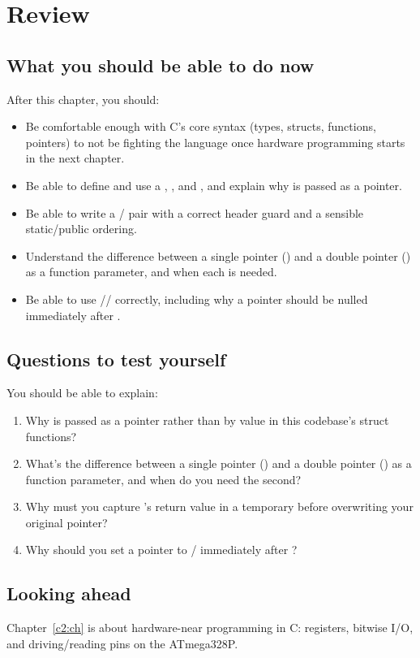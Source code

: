 
\section{Review}
\label{c1:sec:review}

\subsection*{What you should be able to do now}
After this chapter, you should:
\begin{itemize}
  \item Be comfortable enough with C's core syntax (types, structs, functions, pointers) to not be
    fighting the language once hardware programming starts in the next chapter.
  \item Be able to define and use a , , and , and explain why
     is passed as a pointer.
  \item Be able to write a / pair with a correct header guard and a sensible
    static/public ordering.
  \item Understand the difference between a single pointer () and a double pointer
    () as a function parameter, and when each is needed.
  \item Be able to use // correctly, including why a pointer
    should be nulled immediately after .
\end{itemize}

\subsection*{Questions to test yourself}
You should be able to explain:
\begin{enumerate}
  \item Why is  passed as a pointer rather than by value in this codebase's struct
    functions?
  \item What's the difference between a single pointer () and a double pointer
    () as a function parameter, and when do you need the second?
  \item Why must you capture 's return value in a temporary before overwriting your
    original pointer?
  \item Why should you set a pointer to / immediately after ?
\end{enumerate}

\subsection*{Looking ahead}
Chapter~\ref{c2:ch} is about hardware-near programming in C: registers, bitwise I/O, and
driving/reading pins on the ATmega328P.
